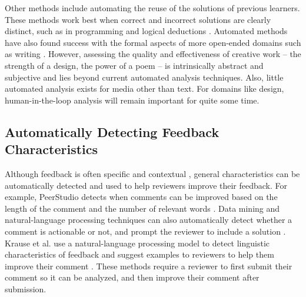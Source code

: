 Other methods include automating the reuse of the solutions of previous learners. These methods work best when correct and incorrect solutions are clearly distinct, such as in programming \cite{Glassman2016Learnersourcing, Hartmann2010} and logical deductions \cite{Fast2013}. Automated methods have also found success with the formal aspects of more open-ended domains such as writing \cite{Brooks2014, Roscoe2014}.  However, assessing the quality and effectiveness of creative work – the strength of a design, the power of a poem – is intrinsically abstract and subjective and lies beyond current automated analysis techniques. Also, little automated analysis exists for media other than text. For domains like design, human-in-the-loop analysis will remain important for quite some time. 

\subsection{Automatically Detecting Feedback Characteristics}
Although feedback is often specific and contextual \cite{Schon1983}, general characteristics can be automatically detected and used to help reviewers improve their feedback. For example, PeerStudio detects when comments can be improved based on the length of the comment and the number of relevant words \cite{Kulkarni2015}. Data mining and natural-language processing techniques can also automatically detect whether a comment is actionable or not, and prompt the reviewer to include a solution \cite{Nguyen2016, Xiong2012}. Krause et al. use a natural-language processing model to detect linguistic characteristics of feedback and suggest examples to reviewers to help them improve their comment \cite{Krause2017}. These methods require a reviewer to first submit their comment so it can be analyzed, and then improve their comment after submission.
